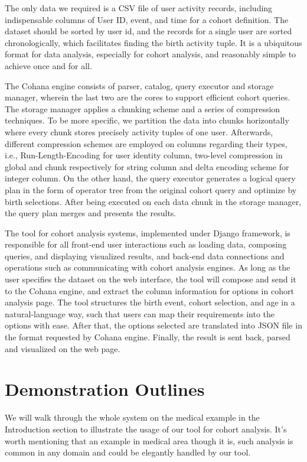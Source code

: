 \documentclass[10pt,conference,letterpaper]{IEEEtran}
\begin{document}
The only data we required is a CSV file of user activity records, including indispensable columns of User ID, event, and time for a cohort definition. The dataset should be sorted by user id, and the records for a single user are sorted chronologically, which facilitates finding the birth activity tuple. It is a ubiquitous format for data analysis, especially for cohort analysis, and reasonably simple to achieve once and for all.

The Cohana engine consists of parser, catalog, query executor and storage manager, wherein the last two are the cores to support efficient cohort queries. The storage manager applies a chunking scheme and a series of compression techniques. To be more specific, we partition the data into chunks horizontally where every chunk stores precisely activity tuples of one user. Afterwards, different compression schemes are employed on columns regarding their types, i.e., Run-Length-Encoding for user identity column, two-level compression in global and chunk respectively for string column and delta encoding scheme for integer column. On the other hand, the query executor generates a logical query plan in the form of operator tree from the original cohort query and optimize by birth selections. After being executed on each data chunk in the storage manager, the query plan merges and presents the results.

The tool for cohort analysis systems, implemented under Django framework, is responsible for all front-end user interactions such as loading data, composing queries, and displaying visualized results, and back-end data connections and operations such as communicating with cohort analysis engines. As long as the user specifies the dataset on the web interface, the tool will compose and send it to the Cohana engine, and extract the column information for options in cohort analysis page. The tool structures the birth event, cohort selection, and age in a natural-language way, such that users can map their requirements into the options with ease. After that, the options selected are translated into JSON file in the format requested by Cohana engine. Finally, the result is sent back, parsed and visualized on the web page.

\section{Demonstration Outlines}

We will walk through the whole system on the medical example in the Introduction section to illustrate the usage of our tool for cohort analysis. It's worth mentioning that an example in medical area though it is, such analysis is common in any domain and could be elegantly handled by our tool.
\end{document}
